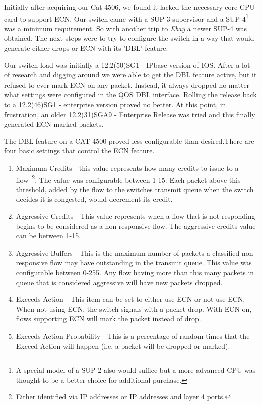 \documentclass[12pt]{article}
\begin{document}
Initially after acquiring our Cat 4506, we found it lacked the necessary core CPU card
to support ECN. Our switch came with a SUP-3 supervisor and a SUP-4\footnote{A special model
of a SUP-2 also would suffice but a more advanced CPU was thought to be a better
choice for additional purchase.}  was a minimum
requirement. So with another trip to \emph{Ebay} a newer SUP-4 was obtained. The
next steps were to try to configure the switch in a way that would generate either drops
or ECN with its 'DBL' feature. 

Our switch load was initially a 12.2(50)SG1 - IPbase version of IOS. After
a lot of research and digging around we were able to get the DBL feature active, but it
refused to ever mark ECN on any packet. Instead, it always dropped no matter what
settings were configured in the QOS DBL interface. Rolling the release back to a 12.2(46)SG1 - enterprise version 
proved no better. At this point, in frustration, an older 12.2(31)SGA9 - Enterprise Release was tried and this finally
generated ECN marked packets. 

The DBL feature on a CAT 4500 proved less configurable than desired.There are four
basic settings that control the ECN feature. 

\begin{enumerate}

\item Maximum Credits - this value represents how many credits to issue to a
flow~\footnote{Either identified via IP addresses or IP addresses and layer 4 ports.}.
The value was configurable between 1-15. Each
packet above this threshold, added by the flow to the switches transmit queue when the
switch decides it is congested, would decrement its credit.

\item Aggressive Credits - This value represents when a flow that is not responding begins
to be considered as a non-responsive flow. The aggressive credits value
can be between 1-15.

\item Aggressive Buffers - This is the maximum number of packets a classified non-responsive
flow may have outstanding in the transmit queue. This value was configurable  between 0-255.
Any flow having more than this many packets in queue that is considered aggressive will have
new packets dropped.

\item Exceeds Action - This item can be set to either use ECN or not use ECN. When not
using ECN, the switch signals with a packet drop. With ECN on, flows supporting
ECN will mark the packet instead of drop.

\item Exceeds Action Probability - This is a percentage of random times that the Exceed
Action will happen (i.e. a packet will be dropped or marked).

\end{enumerate}
\end{document}
